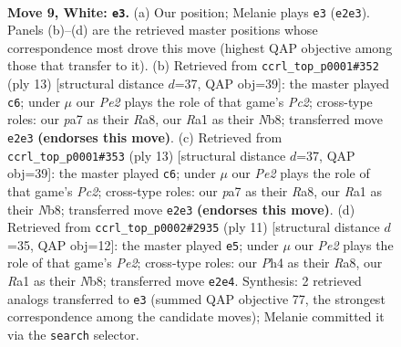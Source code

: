 \documentclass[11pt]{article}
\begin{document}
\clearpage

\begin{figure}[p]\centering
\begin{subfigure}{0.46\textwidth}\centering
\resizebox{\linewidth}{!}{%
\newchessgame
\chessboard[
  setfen={1rbq1rk1/pp1p1pbp/2n2np1/2p1p3/2P4P/5NP1/PP1PPPB1/RNBQ1RK1 w - - 0 9},
  showmover=false,
  pgfstyle=straightmove, color=movearrow, markmove={e2-e3}
]}
\caption{}
\end{subfigure}\hfill
\begin{subfigure}{0.46\textwidth}\centering
\resizebox{\linewidth}{!}{%
\newchessgame
\chessboard[
  setfen={rnbq1rk1/ppp2pbp/3p1np1/4p3/2P1P3/2N3P1/PP1PNPBP/R1BQ1RK1 b - - 3 7},
  showmover=false,
  pgfstyle=straightmove, color=movearrow, markmove={c7-c6}
]}
\caption{}
\end{subfigure}
\\[4pt]
\begin{subfigure}{0.46\textwidth}\centering
\resizebox{\linewidth}{!}{%
\newchessgame
\chessboard[
  setfen={rnbq1rk1/ppp2pbp/3p1np1/4p3/2P1P3/2N3P1/PP1PNPBP/R1BQ1RK1 b - - 3 7},
  showmover=false,
  pgfstyle=straightmove, color=movearrow, markmove={c7-c6}
]}
\caption{}
\end{subfigure}\hfill
\begin{subfigure}{0.46\textwidth}\centering
\resizebox{\linewidth}{!}{%
\newchessgame
\chessboard[
  setfen={rnbq1rk1/ppp1ppbp/3p1np1/8/2P5/2N2NP1/PP1PPPBP/R1BQ1RK1 b - - 1 6},
  showmover=false,
  pgfstyle=straightmove, color=movearrow, markmove={e7-e5}
]}
\caption{}
\end{subfigure}
\caption{\textbf{Move 9, White: \texttt{e3}.} (a) Our position; Melanie plays \texttt{e3} (\texttt{e2e3}). Panels (b)--(d) are the retrieved master positions whose correspondence most drove this move (highest QAP objective among those that transfer to it). (b) Retrieved from \texttt{ccrl\_top\_p0001\#352} (ply 13) [structural distance $d$=37, QAP obj=39]: the master played \texttt{c6}; under $\mu$ our \emph{Pe2} plays the role of that game's \emph{Pc2}; cross-type roles: our \emph{p}a7 as their \emph{R}a8, our \emph{R}a1 as their \emph{N}b8; transferred move \texttt{e2e3} \textbf{(endorses this move)}. (c) Retrieved from \texttt{ccrl\_top\_p0001\#353} (ply 13) [structural distance $d$=37, QAP obj=39]: the master played \texttt{c6}; under $\mu$ our \emph{Pe2} plays the role of that game's \emph{Pc2}; cross-type roles: our \emph{p}a7 as their \emph{R}a8, our \emph{R}a1 as their \emph{N}b8; transferred move \texttt{e2e3} \textbf{(endorses this move)}. (d) Retrieved from \texttt{ccrl\_top\_p0002\#2935} (ply 11) [structural distance $d$=35, QAP obj=12]: the master played \texttt{e5}; under $\mu$ our \emph{Pe2} plays the role of that game's \emph{Pe2}; cross-type roles: our \emph{P}h4 as their \emph{R}a8, our \emph{R}a1 as their \emph{N}b8; transferred move \texttt{e2e4}. Synthesis: 2 retrieved analogs transferred to \texttt{e3} (summed QAP objective 77, the strongest correspondence among the candidate moves); Melanie committed it via the \texttt{search} selector.}
\label{fig:thought-m16}
\end{figure}
\end{document}
